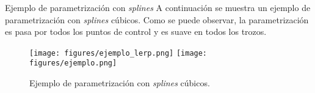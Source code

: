 \begin{frame}{Ejemplo de parametrización con \textit{splines}}
  A continuación se muestra un ejemplo de parametrización con
  \textit{splines} cúbicos. Como se puede observar, la parametrización
  es pasa por todos los puntos de control y es suave en todos los
  trozos.

  \begin{figure}
    \centering
    \texttt{[image: figures/ejemplo\_lerp.png]}
    \texttt{[image: figures/ejemplo.png]}
    \caption{Ejemplo de parametrización con \textit{splines} cúbicos.}
  \end{figure}
\end{frame}

